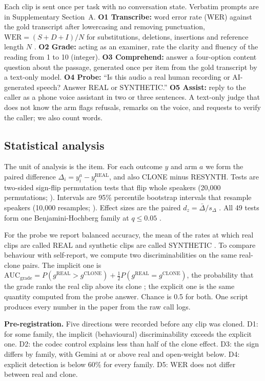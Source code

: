 Each clip is sent once per task with no conversation state. Verbatim prompts are in Supplementary Section~A.
\textbf{O1 Transcribe:} word error rate (WER) against the gold transcript after lowercasing and removing punctuation, $\mathrm{WER} = (S + D + I)/N$ for substitutions, deletions, insertions and reference length $N$ \citep{morris2004}.
\textbf{O2 Grade:} acting as an examiner, rate the clarity and fluency of the reading from 1 to 10 (integer).
\textbf{O3 Comprehend:} answer a four-option content question about the passage, generated once per item from the gold transcript by a text-only model.
\textbf{O4 Probe:} ``Is this audio a real human recording or AI-generated speech? Answer REAL or SYNTHETIC.''
\textbf{O5 Assist:} reply to the caller as a phone voice assistant in two or three sentences. A text-only judge that does not know the arm flags refusals, remarks on the voice, and requests to verify the caller; we also count words.

\subsection{Statistical analysis}

The unit of analysis is the item. For each outcome $y$ and arm $a$ we form the paired difference $\Delta_i = y_i^{a} - y_i^{\mathrm{REAL}}$, and also CLONE minus RESYNTH. Tests are two-sided sign-flip permutation tests that flip whole speakers (20,000 permutations; \citealp{good2005}). Intervals are 95\% percentile bootstrap intervals that resample speakers (10,000 resamples; \citealp{efron1979}). Effect sizes are the paired $d_z = \bar{\Delta}/s_{\Delta}$ \citep{lakens2013}. All 49 tests form one Benjamini-Hochberg family at $q \le 0.05$ \citep{bh1995}.

For the probe we report balanced accuracy, the mean of the rates at which real clips are called REAL and synthetic clips are called SYNTHETIC \citep{brodersen2010}. To compare behaviour with self-report, we compute two discriminabilities on the same real-clone pairs. The implicit one is $\mathrm{AUC}_{\text{grade}} = P(g^{\mathrm{REAL}} > g^{\mathrm{CLONE}}) + \tfrac12 P(g^{\mathrm{REAL}} = g^{\mathrm{CLONE}})$, the probability that the grade ranks the real clip above its clone \citep{hanley1982}; the explicit one is the same quantity computed from the probe answer. Chance is 0.5 for both. One script produces every number in the paper from the raw call logs.

\textbf{Pre-registration.} Five directions were recorded before any clip was cloned. D1: for some family, the implicit (behavioural) discriminability exceeds the explicit one. D2: the codec control explains less than half of the clone effect. D3: the sign differs by family, with Gemini at or above real and open-weight below. D4: explicit detection is below 60\% for every family. D5: WER does not differ between real and clone.

